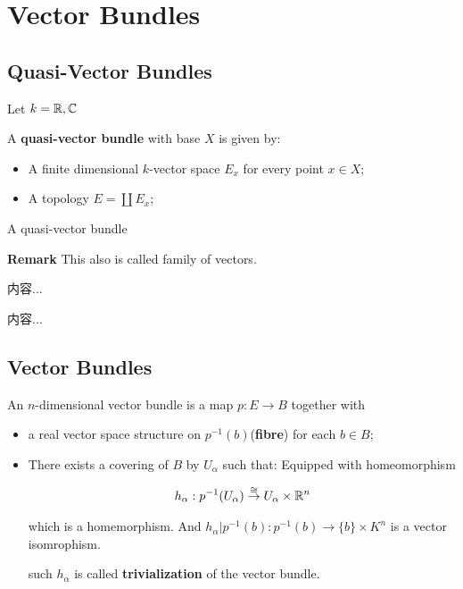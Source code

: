 \documentclass[Total.tex]{subfiles}
\begin{document}
	\chapter{Vector Bundles}
		\section{Quasi-Vector Bundles}
			
			Let $k=\mathbb{R},\mathbb{C}$
			\begin{Def}
				A \textbf{quasi-vector bundle} with base $X$ is given by:
				\begin{itemize}
					\item A finite dimensional $k$-vector space $E_x$ for every point $x\in X$;
					\item A topology $E=\coprod E_x$;
				\end{itemize}
				
				A quasi-vector bundle 
			\end{Def}
			
			\textbf{Remark} This also is called family of vectors.
			
			\begin{example}
				内容...
			\end{example}
			
			\begin{example}
				内容...
			\end{example}
	
		\section{Vector Bundles}
			
			\begin{Def}
				An $n$-dimensional vector bundle is a map $p:E\rightarrow B$ together with 
				
				\begin{itemize}
					\item a real vector space structure on $p^{-1}(b)$(\textbf{fibre}) for each $b\in B$;
					
					\item There exists a covering of $B$ by $U_\alpha$ such that: Equipped with homeomorphism
					
					\begin{gather*}
						h_\alpha:p^{-1}(U_\alpha)\stackrel{\cong}{\rightarrow} U_\alpha\times \mathbb{R}^n
					\end{gather*}
					
					which is a homemorphism. And $h_{\alpha}|p^{-1}(b):p^{-1}(b)\rightarrow \{b\}\times K^n$ is a vector isomrophism.
					
					such $h_\alpha$ is called \textbf{trivialization} of the vector bundle. 
				\end{itemize}
			\end{Def}
			
\end{document}
